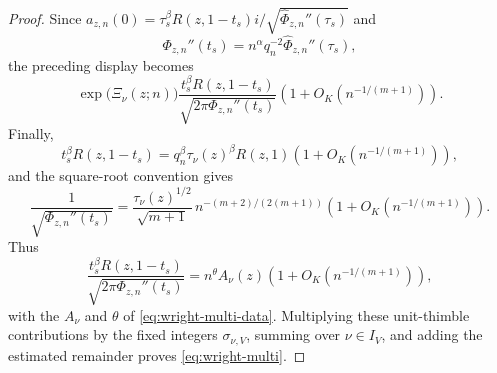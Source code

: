 \documentclass[reqno]{article}
\theoremstyle{definition}
\theoremstyle{remark}
\theoremstyle{plain}
\begin{document}
\begin{proof}
Since $a_{z,n}(0)=\tau_s^\beta R(z,1-t_s)i/\sqrt{\widehat\Phi_{z,n}''(\tau_s)}$ and
$$\Phi_{z,n}''(t_s)=n^\alpha q_n^{-2}\widehat\Phi_{z,n}''(\tau_s),$$
the preceding display becomes
$$\exp\!\bigl(\Xi_\nu(z;n)\bigr)
\frac{t_s^\beta R(z,1-t_s)}{\sqrt{2\pi\Phi_{z,n}''(t_s)}}
\left(1+O_K\!\left(n^{-1/(m+1)}\right)\right).$$
Finally,
$$t_s^\beta R(z,1-t_s)=q_n^\beta\tau_\nu(z)^\beta R(z,1)
\left(1+O_K\!\left(n^{-1/(m+1)}\right)\right),$$
and the square-root convention gives
$$\frac{1}{\sqrt{\Phi_{z,n}''(t_s)}}=
\frac{\tau_\nu(z)^{1/2}}{\sqrt{m+1}}\,n^{-(m+2)/(2(m+1))}
\left(1+O_K\!\left(n^{-1/(m+1)}\right)\right).$$
Thus
$$\frac{t_s^\beta R(z,1-t_s)}{\sqrt{2\pi\Phi_{z,n}''(t_s)}}
=n^\theta A_\nu(z)\left(1+O_K\!\left(n^{-1/(m+1)}\right)\right),$$
with the $A_\nu$ and $\theta$ of \eqref{eq:wright-multi-data}. Multiplying these unit-thimble contributions by the fixed integers $\sigma_{\nu,V}$, summing over $\nu\in I_V$, and adding the estimated remainder proves \eqref{eq:wright-multi}.
\end{proof}
\end{document}
